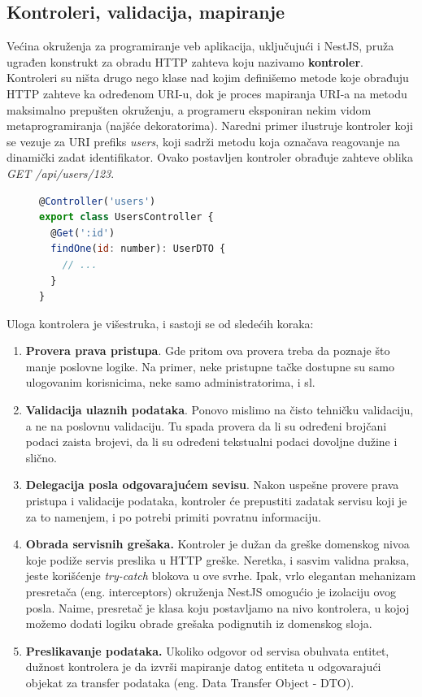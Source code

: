 \documentclass[12pt,oneside]{memoir}
\begin{document}
\subsection{Kontroleri, validacija, mapiranje}

Većina okruženja za programiranje veb aplikacija, uključujući i NestJS, pruža ugrađen konstrukt za obradu HTTP zahteva koju nazivamo \textbf{kontroler}. Kontroleri su ništa drugo nego klase nad kojim definišemo metode koje obrađuju HTTP zahteve ka određenom URI-u, dok je proces mapiranja URI-a na metodu maksimalno prepušten okruženju, a programeru eksponiran nekim vidom metaprogramiranja (najšće dekoratorima). Naredni primer ilustruje kontroler koji se vezuje za URI prefiks \textit{users}, koji sadrži metodu koja označava reagovanje na dinamički zadat identifikator. Ovako postavljen kontroler obrađuje zahteve oblika \textit{GET /api/users/123}.

\begin{figure}[h]
\begin{lstlisting}[language=JavaScript, style=ES6, caption={primer kontrolera}]
@Controller('users')
export class UsersController {
  @Get(':id')
  findOne(id: number): UserDTO {
    // ...
  }
}
\end{lstlisting}
\end{figure}

Uloga kontrolera je višestruka, i sastoji se od sledećih koraka:
\begin{enumerate}
    \item \textbf{Provera prava pristupa}. Gde pritom ova provera treba da poznaje što manje poslovne logike. Na primer, neke pristupne tačke dostupne su samo ulogovanim korisnicima, neke samo administratorima, i sl.
    \item \textbf{Validacija ulaznih podataka}. Ponovo mislimo na čisto tehničku validaciju, a ne na poslovnu validaciju. Tu spada provera da li su određeni brojčani podaci zaista brojevi, da li su određeni tekstualni podaci dovoljne dužine i slično.
    \item \textbf{Delegacija posla odgovarajućem sevisu}. Nakon uspešne provere prava pristupa i validacije podataka, kontroler će prepustiti zadatak servisu koji je za to namenjem, i po potrebi primiti povratnu informaciju.
    \item \textbf{Obrada servisnih grešaka.} Kontroler je dužan da greške domenskog nivoa koje podiže servis preslika u HTTP greške. Neretka, i sasvim validna praksa, jeste korišćenje \textit{try-catch} blokova u ove svrhe. Ipak, vrlo elegantan mehanizam presretača (eng. interceptors) okruženja NestJS omogućio je izolaciju ovog posla. Naime, presretač je klasa koju postavljamo na nivo kontrolera, u kojoj možemo dodati logiku obrade grešaka podignutih iz domenskog sloja.
    \item \textbf{Preslikavanje podataka.} Ukoliko odgovor od servisa obuhvata entitet, dužnost kontrolera je da izvrši mapiranje datog entiteta u odgovarajući objekat za transfer podataka (eng. Data Transfer Object - DTO).
\end{enumerate}
\end{document}
